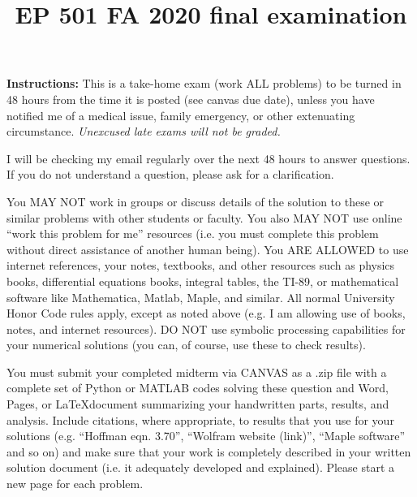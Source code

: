 \documentclass{article}
\begin{document}
\title{EP 501 FA 2020 final examination}

\maketitle

\textbf{Instructions:  }This is a take-home exam (work ALL problems) to be turned in 48 hours from the time it is posted (see canvas due date), unless you have notified me of a medical issue, family emergency, or other extenuating circumstance.  \emph{Unexcused late exams will not be graded.}

I will be checking my email regularly over the next 48 hours to answer questions.  If you do not understand a question, please ask for a clarification.  

You MAY NOT work in groups or discuss details of the solution to these or similar problems with other students or faculty.  You also MAY NOT use online ``work this problem for me'' resources (i.e. you must complete this problem without direct assistance of another human being).  You ARE ALLOWED to use internet references, your notes, textbooks, and other resources such as physics books, differential equations books, integral tables, the TI-89, or mathematical software like Mathematica, Matlab, Maple, and similar.  All normal University Honor Code rules apply, except as noted above (e.g. I am allowing use of books, notes, and internet resources).  DO NOT use symbolic processing capabilities for your numerical solutions (you can, of course, use these to check results).  

You must submit your completed midterm via CANVAS as a .zip file with a complete set of Python or MATLAB codes solving these question and Word, Pages, or \LaTeX document summarizing your handwritten parts, results, and analysis.  Include citations, where appropriate, to results that you use for your solutions (e.g. ``Hoffman eqn. 3.70'', ``Wolfram website (link)'', ``Maple software'' and so on) and make sure that your work is completely described in your written solution document (i.e. it adequately developed and explained).  Please start a new page for each problem.  


\end{document}
